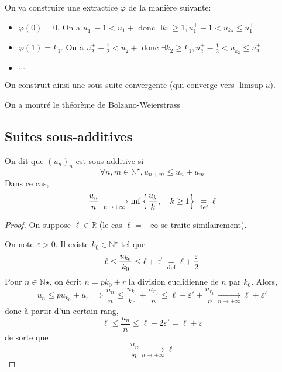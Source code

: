 On va construire une extractice $\varphi$ de la manière suivante: \begin{itemize}
    \item $\varphi(0)=0$. On a $u_1^+-1<u_1+$ donc $\exists k_1\geq 1, u_1^+-1<u_{k_2}\leq u_1^+$
    \item $\varphi(1)=k_1$. On a $u_2^+-\frac12<u_2+$ donc $\exists k_2\geq k_1, u_2^+-\frac12<u_{k_2}\leq u_2^+$
    \item $\cdots$
\end{itemize}
On construit ainsi une sous-suite convergente (qui converge vers $\limsup u$).

\begin{rem}
    On a montré le théorème de Bolzano-Weierstrass
\end{rem}

\needspace{5cm}
\subsection{Suites sous-additives}

\begin{res}
    On dit que $(u_n)_n$ est sous-additive si \[
        \forall n, m\in\mathbb N^\star, u_{n+m}\leq u_n+u_m
    \]
    Dans ce cas, \[
        \frac{u_n}n\xrightarrow[n\to+\infty]{}\inf\left\{\frac{u_k}k, \quad k\geq 1\right\}\;\underset{\text{def}}=\;\ell
    \]
\end{res}

\begin{proof}
    On suppose $\ell\in\mathbb R$ (le cas $\ell=-\infty$ se traite similairement).

    On note $\varepsilon>0$. Il existe $k_0\in\mathbb N^\star$ tel que \[
        \ell\leq \frac{u_{k_0}}{k_0}\leq \ell+\varepsilon'\;\underset{\text{def}}=\;\ell+\frac\varepsilon2
    \]
    Pour $n\in\mathbb N$$\star$, on écrit $n=pk_0+r$ la division euclidienne de $n$ par $k_0$. Alors, \[
        u_n\leq pu_{k_0}+u_r\implies \frac{u_n}n\leq \frac{u_{k_0}}{k_0}+\frac{u_{r_0}}n\leq \ell+\varepsilon'+\frac{u_{r_0}}n\xrightarrow[n\to+\infty]{}\ell+\varepsilon'
    \]
    donc à partir d'un certain rang, \[
        \ell\leq \frac{u_n}n\leq \ell+2\varepsilon'=\ell+\varepsilon
    \]
    de sorte que \[
        \frac{u_n}n\xrightarrow[n\to+\infty]{}\ell
    \]
\end{proof}

